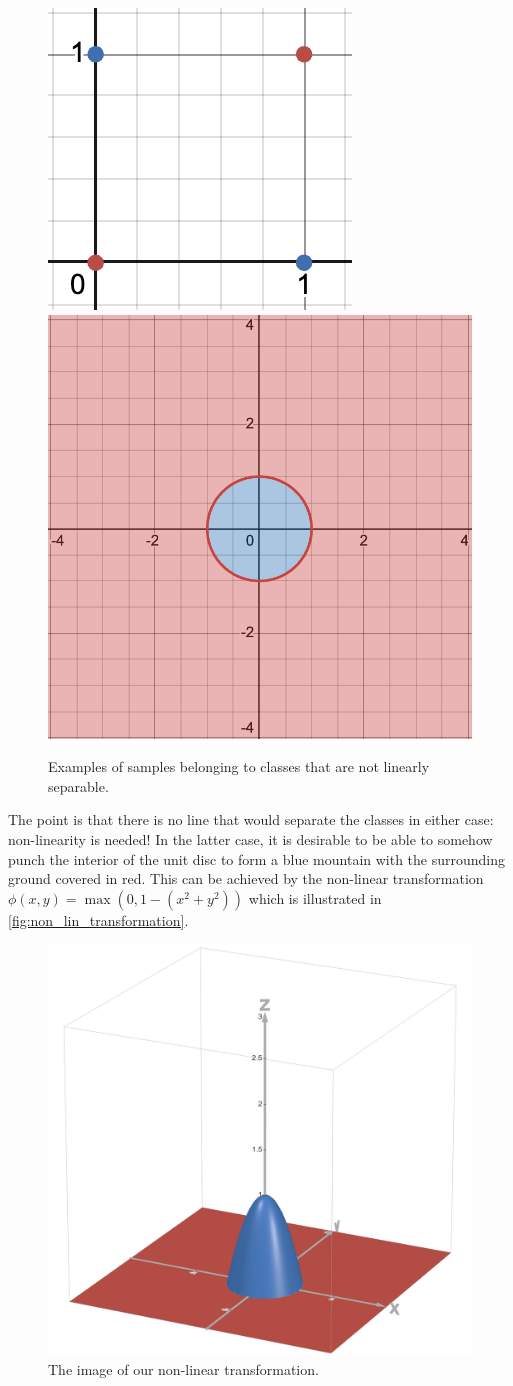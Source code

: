 \documentclass[11pt]{article}
\begin{document}
\begin{figure}[t]
    \centering
    \includegraphics[width=0.40\columnwidth]{./figures/neural_nets/NLA_xor.png}
    \hspace{20pt}
    \includegraphics[width=0.40\columnwidth]{./figures/neural_nets/NLA_circle.png}
    \caption{Examples of samples belonging to classes that are not linearly separable. }
    \label{fig:non_linearly_separable}
\end{figure}

The point is that there is no line that would separate the classes in either case: non-linearity is needed! In the latter case, it is desirable to be able to somehow punch the interior of the unit disc to form a blue mountain with the surrounding ground covered in red. This can be achieved by the non-linear transformation $\phi(x,y)=\max(0,1-(x^2+y^2))$ which is illustrated in \autoref{fig:non_lin_transformation}.

\begin{figure}[t]
    \centering
    \includegraphics[width=0.40\columnwidth]{./figures/neural_nets//NLA_non_lin_transform.png}
    \caption{The image of our non-linear transformation. }
    \label{fig:non_lin_transformation}
\end{figure}
\end{document}
